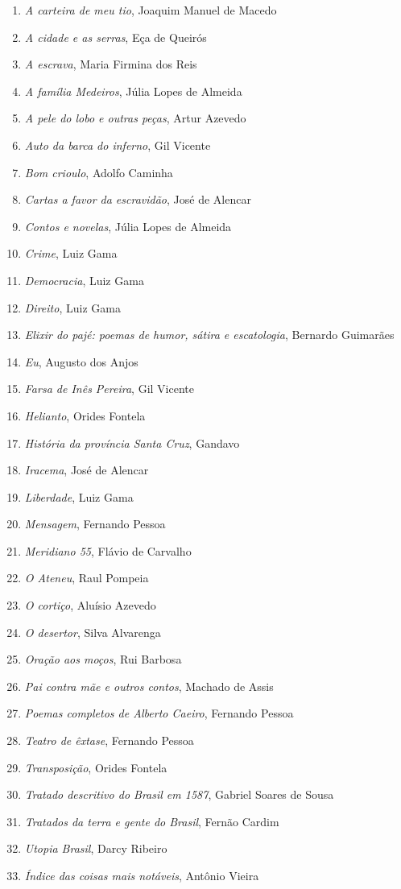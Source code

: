 \begin{enumerate}
\setlength\parskip{4.2pt}
\setlength\itemsep{-1.4mm}
\item \textit{A carteira de meu tio}, Joaquim Manuel de Macedo
\item \textit{A cidade e as serras}, Eça de Queirós
\item \textit{A escrava}, Maria Firmina dos Reis
\item \textit{A família Medeiros}, Júlia Lopes de Almeida 
\item \textit{A pele do lobo e outras peças}, Artur Azevedo
\item \textit{Auto da barca do inferno}, Gil Vicente
\item \textit{Bom crioulo}, Adolfo Caminha
\item \textit{Cartas a favor da escravidão}, José de Alencar
\item \textit{Contos e novelas}, Júlia Lopes de Almeida
\item \textit{Crime}, Luiz Gama
\item \textit{Democracia}, Luiz Gama
\item \textit{Direito}, Luiz Gama
\item \textit{Elixir do pajé: poemas de humor, sátira e escatologia}, Bernardo Guimarães
\item \textit{Eu}, Augusto dos Anjos
\item \textit{Farsa de Inês Pereira}, Gil Vicente
\item \textit{Helianto}, Orides Fontela
\item \textit{História da província Santa Cruz}, Gandavo
\item \textit{Iracema}, José de Alencar
\item \textit{Liberdade}, Luiz Gama
\item \textit{Mensagem}, Fernando Pessoa
\item \textit{Meridiano 55}, Flávio de Carvalho
\item \textit{O Ateneu}, Raul Pompeia
\item \textit{O cortiço}, Aluísio Azevedo
\item \textit{O desertor}, Silva Alvarenga
\item \textit{Oração aos moços}, Rui Barbosa
\item \textit{Pai contra mãe e outros contos}, Machado de Assis
\item \textit{Poemas completos de Alberto Caeiro}, Fernando Pessoa
\item \textit{Teatro de êxtase}, Fernando Pessoa
\item \textit{Transposição}, Orides Fontela
\item \textit{Tratado descritivo do Brasil em 1587}, Gabriel Soares de Sousa
\item \textit{Tratados da terra e gente do Brasil}, Fernão Cardim 
\item \textit{Utopia Brasil}, Darcy Ribeiro
\item \textit{Índice das coisas mais notáveis}, Antônio Vieira
\end{enumerate}


